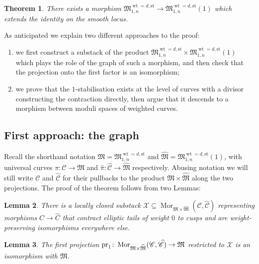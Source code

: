 \documentclass[11pt]{amsart}
\renewcommand{\to}{\rightarrow}
\newcommand{\pr}{\rm{pr}}
\newcommand{\cC}{\mathcal C}
\newcommand{\hC}{\widehat{\mathcal C}}
\newcommand{\MM}{\mathfrak M}
\newcommand{\hM}{\widehat{\mathfrak M}}
\theoremstyle{plain}
\newtheorem{thm}{Theorem}[section]
\newtheorem{lem}[thm]{Lemma}
\theoremstyle{definition}
\begin{document}

\begin{thm}
There exists a morphism $\mathfrak M_{1,n}^{\operatorname{wt}=d,\text{st}}\to\mathfrak M_{1,n}^{\operatorname{wt}=d,\text{st}}(1)$ which extends the identity on the smooth locus.
\end{thm} 
As anticipated we explain two different approaches to the proof:
\begin{enumerate}
 \item we first construct a substack of the product $\mathfrak M_{1,n}^{\operatorname{wt}=d,\text{st}}\times\mathfrak M_{1,n}^{\operatorname{wt}=d,\text{st}}(1)$ which plays the role of the graph of such a morphism, and then check that the projection onto the first factor is an isomorphism;
\item we prove that the $1$-stabilisation exists at the level of curves with a divisor constructing the contraction directly, then argue that it descends to a morphism between moduli spaces of weighted curves.
\end{enumerate}

\subsection{First approach: the graph}

Recall the shorthand notation $\MM=\mathfrak M_{1,n}^{\operatorname{wt}=d,\text{st}}$ and $\hM=\mathfrak M_{1,n}^{\operatorname{wt}=d,\text{st}}(1)$, with universal curves $\pi\colon \cC\to \MM$ and $\hat\pi\colon\hC\to\hM$ respectively. Abusing notation we will still write $\cC$ and $\hC$ for their pullbacks to the product $\MM\times\hM$ along the two projections. The proof of the theorem follows from two Lemmas:

\begin{lem}\label{lemma:def_X}
 There is a locally closed substack $\mathcal X\subseteq\operatorname{Mor}_{\MM\times\hM}(\cC,\hC)$ representing morphisms $C\to \widehat{C}$ that contract elliptic tails of weight $0$ to cusps and are weight-preserving isomorphisms everywhere else. 
\end{lem}

\begin{lem}\label{lamma:projection_iso}
 The first projection $\pr_1\colon \operatorname{Mor}_{\MM\times\hM}(\cC,\hC)\to\MM$ restricted to $\mathcal X$ is an isomorphism with $\MM$.
\end{lem}
\end{document}
